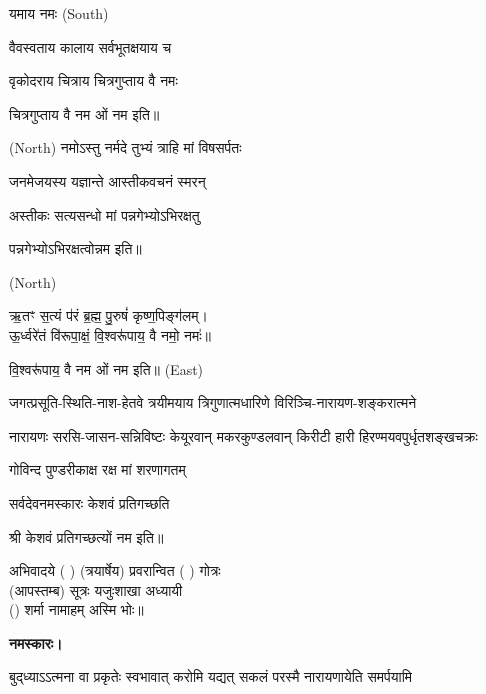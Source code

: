 यमाय नमः   {\scriptsize (South)}

{वैवस्वताय   कालाय   सर्वभूतक्षयाय   च}

{वृकोदराय   चित्राय   चित्रगुप्ताय   वै  नमः}

चित्रगुप्ताय   वै  नम ओं नम इति॥

 {\scriptsize (North)}
{नमोऽस्तु नर्मदे तुभ्यं त्राहि मां विषसर्पतः}

{जनमेजयस्य यज्ञान्ते आस्तीकवचनं स्मरन्}


{अस्तीकः सत्यसन्धो मां पन्नगेभ्योऽभिरक्षतु}

पन्नगेभ्योऽभिरक्षत्वोन्नम इति॥

 {\scriptsize (North)}

ऋ॒तꣳ स॒त्यं प॑रं ब्र॒ह्म॒ पु॒रुषं॑ कृष्ण॒पिङ्ग॑लम्।\\
ऊ॒र्ध्वरे॑तं वि॑रूपा॒क्षं॒ वि॒श्वरू॑पाय॒ वै नमो॒ नमः॑॥


वि॒श्वरू॑पाय॒ वै नम ओं नम इति॥
{\scriptsize (East)}

{जगत्प्रसूति-स्थिति-नाश-हेतवे}
{त्रयीमयाय त्रिगुणात्मधारिणे}
{विरिञ्चि-नारायण-शङ्करात्मने}

{नारायणः सरसि-जासन-सन्निविष्टः}
{केयूरवान् मकरकुण्डलवान् किरीटी}
{हारी हिरण्मयवपुर्धृतशङ्खचक्रः}

{गोविन्द पुण्डरीकाक्ष रक्ष मां शरणागतम्}

{सर्वदेवनमस्कारः केशवं प्रतिगच्छति}

श्री केशवं प्रतिगच्छत्यों नम इति॥

अभिवादये ( ) (त्रयार्षेय) प्रवरान्वित ( ) गोत्रः\\
(आपस्तम्ब) सूत्रः यजुःशाखा अध्यायी\\
() शर्मा नामाहम् अस्मि भोः॥

\textbf{नमस्कारः।}

{बुद्‌ध्याऽऽत्मना वा प्रकृतेः स्वभावात्}
{करोमि यद्यत् सकलं परस्मै}
{नारायणायेति समर्पयामि}

